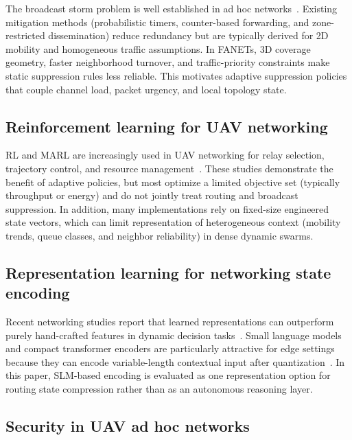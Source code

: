 \documentclass[5p,times]{elsarticle}
\begin{document}
The broadcast storm problem is well established in ad hoc networks~\cite{tseng2002broadcast}. Existing mitigation methods (probabilistic timers, counter-based forwarding, and zone-restricted dissemination) reduce redundancy but are typically derived for 2D mobility and homogeneous traffic assumptions. In FANETs, 3D coverage geometry, faster neighborhood turnover, and traffic-priority constraints make static suppression rules less reliable. This motivates adaptive suppression policies that couple channel load, packet urgency, and local topology state.

\subsection{Reinforcement learning for UAV networking}

RL and MARL are increasingly used in UAV networking for relay selection, trajectory control, and resource management~\cite{liu2019rl_routing,lowe2017maddpg,yu2022mappo,zhao2024marl_uav,wang2023drl_fanet}. These studies demonstrate the benefit of adaptive policies, but most optimize a limited objective set (typically throughput or energy) and do not jointly treat routing and broadcast suppression. In addition, many implementations rely on fixed-size engineered state vectors, which can limit representation of heterogeneous context (mobility trends, queue classes, and neighbor reliability) in dense dynamic swarms.

\subsection{Representation learning for networking state encoding}

Recent networking studies report that learned representations can outperform purely hand-crafted features in dynamic decision tasks~\cite{he2024large_networking,mittal2024survey_edge_llm}. Small language models and compact transformer encoders are particularly attractive for edge settings because they can encode variable-length contextual input after quantization~\cite{abdin2024phi3,zhang2024tinyllama,lin2024awq,xu2024survey_slm}. In this paper, SLM-based encoding is evaluated as one representation option for routing state compression rather than as an autonomous reasoning layer.

\subsection{Security in UAV ad hoc networks}
\end{document}
